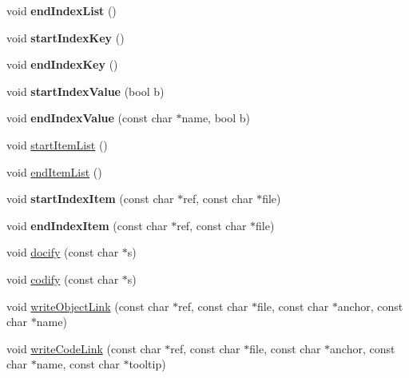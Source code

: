\begin{DoxyCompactItemize}
void {\bfseries end\+Index\+List} ()
\item 
\mbox{\label{class_output_list_a193f96c7af956fe9443ffc099fc5cc13}} 
void {\bfseries start\+Index\+Key} ()
\item 
\mbox{\label{class_output_list_a68031752ec7526128f5c77b7e18e932e}} 
void {\bfseries end\+Index\+Key} ()
\item 
\mbox{\label{class_output_list_a9ffa966ddc43f8d39e5a1e74a814ebef}} 
void {\bfseries start\+Index\+Value} (bool b)
\item 
\mbox{\label{class_output_list_a06d11b44b854f803a0eb267453f8561c}} 
void {\bfseries end\+Index\+Value} (const char $\ast$name, bool b)
\item 
void \mbox{\hyperlink{class_output_list_a1677b65eb8f01a10b1d767758338a212}{start\+Item\+List}} ()
\item 
void \mbox{\hyperlink{class_output_list_ac6efca5985597bb6e51427c51d40732f}{end\+Item\+List}} ()
\item 
\mbox{\label{class_output_list_ae2d57b80570bd6200cf2bba40e7aebeb}} 
void {\bfseries start\+Index\+Item} (const char $\ast$ref, const char $\ast$file)
\item 
\mbox{\label{class_output_list_ac4298a7ba49c15f18cc1c8fff9e4555d}} 
void {\bfseries end\+Index\+Item} (const char $\ast$ref, const char $\ast$file)
\item 
void \mbox{\hyperlink{class_output_list_a3335d926bd59e1c9e3912c4352ca5bc6}{docify}} (const char $\ast$s)
\item 
void \mbox{\hyperlink{class_output_list_a81c7d3f51fa62b85c2699830f7170ccd}{codify}} (const char $\ast$s)
\item 
void \mbox{\hyperlink{class_output_list_a8c499e7baca8905c8e057d23f72ff548}{write\+Object\+Link}} (const char $\ast$ref, const char $\ast$file, const char $\ast$anchor, const char $\ast$name)
\item 
void \mbox{\hyperlink{class_output_list_adebe51dec7320f28fe291d5e1dae740c}{write\+Code\+Link}} (const char $\ast$ref, const char $\ast$file, const char $\ast$anchor, const char $\ast$name, const char $\ast$tooltip)
\item 

\end{DoxyCompactItemize}
